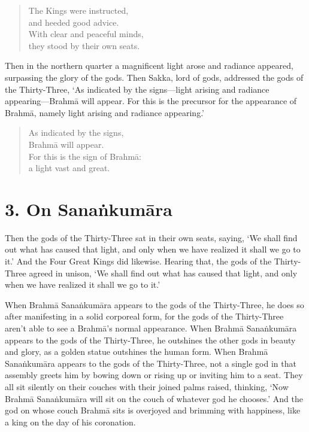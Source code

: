 \documentclass[12pt,openany]{book}%
\begin{document}
\begin{verse}%
The Kings were instructed, \\
and heeded good advice. \\
With clear and peaceful minds, \\
they stood by their own seats. 

%
\end{verse}

Then in the northern quarter a magnificent light arose and radiance appeared, surpassing the glory of the gods. Then Sakka, lord of gods, addressed the gods of the Thirty-Three, ‘As indicated by the signs—light arising and radiance appearing—\textsanskrit{Brahmā} will appear. For this is the precursor for the appearance of \textsanskrit{Brahmā}, namely light arising and radiance appearing.’ 

\begin{verse}%
As indicated by the signs, \\
\textsanskrit{Brahmā} will appear. \\
For this is the sign of \textsanskrit{Brahmā}: \\
a light vast and great. 

%
\end{verse}

\section*{3. On \textsanskrit{Sanaṅkumāra} }

Then the gods of the Thirty-Three sat in their own seats, saying, ‘We shall find out what has caused that light, and only when we have realized it shall we go to it.’ And the Four Great Kings did likewise. Hearing that, the gods of the Thirty-Three agreed in unison, ‘We shall find out what has caused that light, and only when we have realized it shall we go to it.’ 

When \textsanskrit{Brahmā} \textsanskrit{Sanaṅkumāra} appears to the gods of the Thirty-Three, he does so after manifesting in a solid corporeal form, for the gods of the Thirty-Three aren’t able to see a \textsanskrit{Brahmā}’s normal appearance. When \textsanskrit{Brahmā} \textsanskrit{Sanaṅkumāra} appears to the gods of the Thirty-Three, he outshines the other gods in beauty and glory, as a golden statue outshines the human form. When \textsanskrit{Brahmā} \textsanskrit{Sanaṅkumāra} appears to the gods of the Thirty-Three, not a single god in that assembly greets him by bowing down or rising up or inviting him to a seat. They all sit silently on their couches with their joined palms raised, thinking, ‘Now \textsanskrit{Brahmā} \textsanskrit{Sanaṅkumāra} will sit on the couch of whatever god he chooses.’ And the god on whose couch \textsanskrit{Brahmā} sits is overjoyed and brimming with happiness, like a king on the day of his coronation. 
\end{document}
